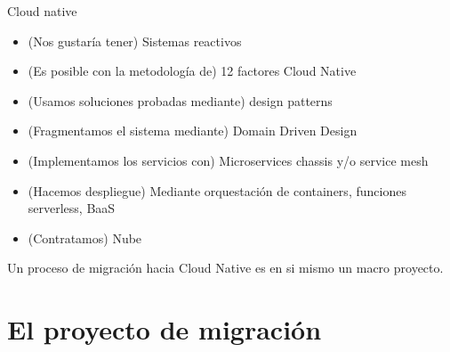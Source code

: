 \documentclass[aspectratio=169]{beamer}
\begin{document}
\begin{frame}{Cloud native}

	\begin{itemize}
		\item (Nos gustaría tener) Sistemas reactivos
		\item (Es posible con la metodología de) 12 factores Cloud Native
        \item (Usamos soluciones probadas mediante) design patterns
        \item (Fragmentamos el sistema mediante) Domain Driven Design
		\item (Implementamos los servicios con) Microservices chassis y/o service mesh
        \item (Hacemos despliegue) Mediante orquestación de containers, funciones serverless, BaaS
        \item (Contratamos)  Nube
	\end{itemize}

Un proceso de migración hacia Cloud Native es en si mismo un macro proyecto.

\end{frame}

{
	\section{El proyecto de migración}
}
\end{document}
